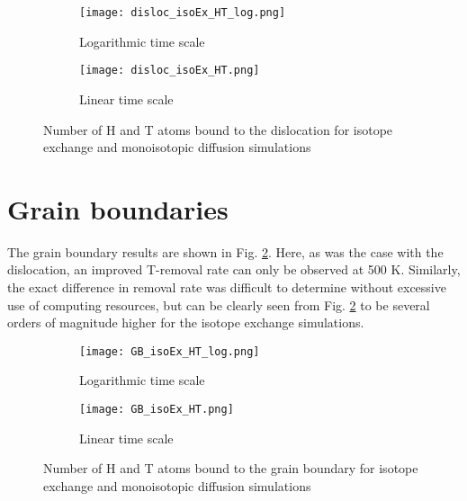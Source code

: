 \vspace{15mm} 

\begin{figure}[!ht]
\begin{subfigure}{.5\textwidth}
  \centering
 \texttt{[image: disloc\_isoEx\_HT\_log.png]}  
  \caption{Logarithmic time scale}
\end{subfigure}
\begin{subfigure}{.5\textwidth}
  \centering
  \texttt{[image: disloc\_isoEx\_HT.png]}  
  \caption{Linear time scale}
\end{subfigure}
   \caption{Number of H and T atoms bound to the dislocation for isotope exchange and monoisotopic diffusion simulations}
   \label{Fig:disloc_results} 
\end{figure}

\pagebreak

\section{Grain boundaries}
The grain boundary results are shown in Fig. \ref{Fig:GB_results}. 
Here, as was the case with the dislocation, an improved T-removal rate can only be observed at 500 K.
Similarly, the exact difference in removal rate was difficult to determine without excessive use of computing resources, but can be clearly seen from Fig. \ref{Fig:GB_results} to be several orders of magnitude higher for the isotope exchange simulations.


\begin{figure}[!ht]
\begin{subfigure}{.5\textwidth}
  \centering
 \texttt{[image: GB\_isoEx\_HT\_log.png]}  
  \caption{Logarithmic time scale}
\end{subfigure}
\begin{subfigure}{.5\textwidth}
  \centering
  \texttt{[image: GB\_isoEx\_HT.png]}  
  \caption{Linear time scale}
\end{subfigure}
   \caption{Number of H and T atoms bound to the grain boundary for isotope exchange and monoisotopic diffusion simulations}
   \label{Fig:GB_results} 
\end{figure}

